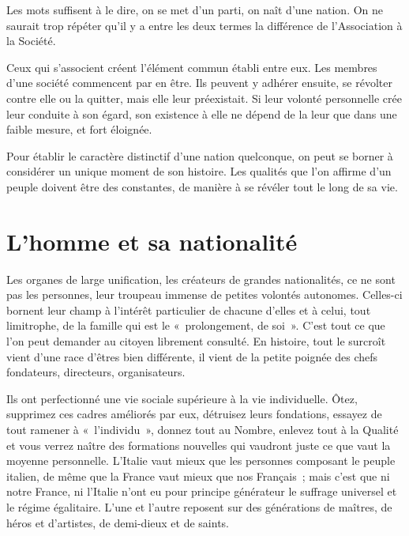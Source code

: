 \documentclass[french,twoside]{book} %
\newcommand{\astermono}{\medskip\centerline{\color{rubric}\large\selectfont{\syms ✻}}\medskip\par}%
\begin{document}
\astermono

\noindent Les mots suffisent à le dire, on se met d’un parti, on naît d’une nation. On ne saurait trop répéter qu’il y a entre les deux termes la différence de l’Association à la Société.\par
Ceux qui s’associent créent l’élément commun établi entre eux. Les membres d’une société commencent par en être. Ils peuvent y adhérer ensuite, se révolter contre elle ou la quitter, mais elle leur préexistait. Si leur volonté personnelle crée leur conduite à son égard, son existence à elle ne dépend de la leur que dans une faible mesure, et fort éloignée.\par

\astermono

\noindent Pour établir le caractère distinctif d’une nation quelconque, on peut se borner à considérer un unique moment de son histoire. Les qualités que l’on affirme d’un peuple doivent être des constantes, de manière à se révéler tout le long de sa vie.
\section[{L’homme et sa nationalité}]{L’homme et sa nationalité}
\noindent Les organes de large unification, les créateurs de grandes nationalités, ce ne sont pas les personnes, leur troupeau immense de petites volontés autonomes. Celles-ci bornent leur champ à l’intérêt particulier de chacune d’elles et à celui, tout limitrophe, de la famille qui est le « prolongement, de soi ». C’est tout ce que l’on peut demander au citoyen librement consulté. En histoire, tout le surcroît vient d’une race d’êtres bien différente, il vient de la petite poignée des chefs fondateurs, directeurs, organisateurs.\par
Ils ont perfectionné une vie sociale supérieure à la vie individuelle. Ôtez, supprimez ces cadres améliorés par eux, détruisez leurs fondations, essayez de tout ramener à « l’individu », donnez tout au Nombre, enlevez tout à la Qualité et vous verrez naître des formations nouvelles qui vaudront juste ce que vaut la moyenne personnelle. L’Italie vaut mieux que les personnes composant le peuple italien, de même que la France vaut mieux que nos Français ; mais c’est que ni notre France, ni l’Italie n’ont eu pour principe générateur le suffrage universel et le régime égalitaire. L’une et l’autre reposent sur des générations de maîtres, de héros et d’artistes, de demi-dieux et de saints.\par
\end{document}
